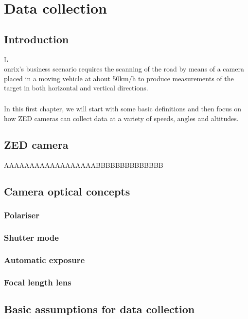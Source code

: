 \chapter{Data collection}

\section*{Introduction}
\lettrine[lines=2]{L}\\ onrix's business scenario requires the scanning of the road by means of a camera placed in a moving vehicle at about 50km/h to produce measurements of the target in both horizontal and vertical directions.

\paragraph*{}
In this first chapter, we will start with some basic definitions and then focus on how ZED cameras can collect data at a variety of speeds, angles and altitudes.

\section{ZED camera}
 
AAAAAAAAAAAAAAAAAABBBBBBBBBBBBBB
\section{Camera optical concepts}

\subsection{Polariser}

 \subsection{Shutter mode}
 
\subsection{Automatic exposure}
 
\subsection{Focal length lens}

 
\section{Basic assumptions for data collection}

